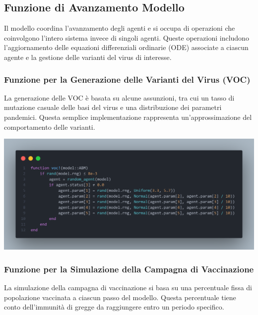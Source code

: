 \subsection{Funzione di Avanzamento Modello}

Il modello coordina l'avanzamento degli agenti e si occupa di 
operazioni che coinvolgono l'intero sistema invece di singoli agenti. 
Queste operazioni includono l'aggiornamento delle equazioni 
differenziali ordinarie (ODE) associate a ciascun agente e la gestione 
delle varianti del virus di interesse.

\subsubsection{Funzione per la Generazione delle Varianti del Virus (VOC)}

La generazione delle VOC è basata su alcune assunzioni, tra cui un 
tasso di mutazione casuale delle basi del virus e una distribuzione 
dei parametri pandemici. Questa semplice implementazione rappresenta 
un'approssimazione del comportamento delle varianti. \cite{Markov2023} 
\cite{https://doi.org/10.1002/jmv.27331} \cite{Abavisani2022}

\begin{minipage}{\linewidth}
	\centering
	\includegraphics[width=\textwidth]{img/voc.png}
	\label{fig:voc}
\end{minipage}

\subsubsection{Funzione per la Simulazione della Campagna di Vaccinazione}

La simulazione della campagna di vaccinazione si basa su una 
percentuale fissa di popolazione vaccinata a ciascun passo del modello. 
Questa percentuale tiene conto dell'immunità di gregge da raggiungere 
entro un periodo specifico.

